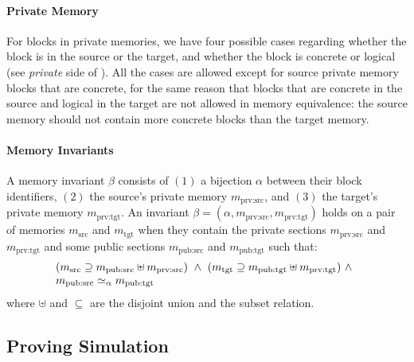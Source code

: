 \paragraph{Private Memory}
For blocks in private memories, we have four possible cases
regarding whether the block is in the source or the target, and
whether the block is concrete or logical (see \emph{private} side of
).  All the cases are allowed except for
source private memory blocks that are concrete, for the same reason
that blocks that are concrete in the source and logical in the target are not
allowed in memory equivalence: the source memory should not contain
more concrete blocks than the target memory.

\paragraph{Memory Invariants}
A memory invariant $\beta$ consists of $(1)$ a bijection $\alpha$ between their
block identifiers, $(2)$ the source's private memory
$m_\textrm{prv:src}$, and $(3)$ the target's private memory
$m_\textrm{prv:tgt}$. 
An invariant $\beta=(\alpha, m_\textrm{prv:src}, m_\textrm{prv:tgt})$ 
holds on a pair of memories $m_{\textrm{src}}$ and
$m_{\textrm{tgt}}$ when they contain the private sections $m_\textrm{prv:src}$ and 
$m_\textrm{prv:tgt}$
and some public sections $m_\textrm{pub:src}$ and
$m_\textrm{pub:tgt}$ such that:
  \[\begin{array}{@{}l}
    (m_{\textrm{src}} \supseteq m_\textrm{pub:src} \uplus m_\textrm{prv:src})~\land~
    (m_{\textrm{tgt}} \supseteq m_\textrm{pub:tgt} \uplus m_\textrm{prv:tgt})~\land\\m_{\textrm{pub:src}} \simeq_\alpha m_{\textrm{pub:tgt}}
  \end{array}\]
  where 
$\uplus$ and $\subseteq$ are the disjoint union and the subset relation.

\subsection{Proving Simulation}
\label{reasoning:simulation}


